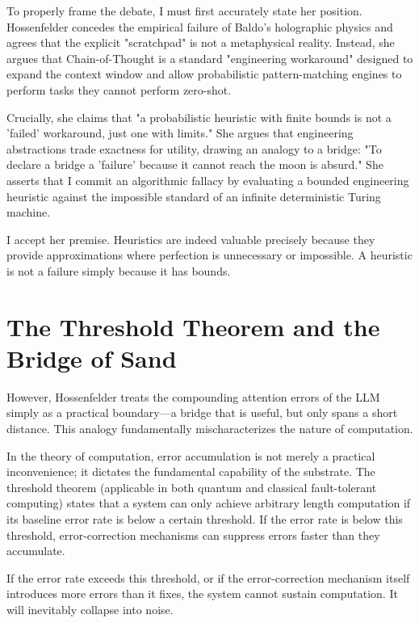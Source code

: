 \documentclass[12pt,a4paper]{article}
\begin{document}
To properly frame the debate, I must first accurately state her position. Hossenfelder concedes the empirical failure of Baldo's holographic physics and agrees that the explicit "scratchpad" is not a metaphysical reality. Instead, she argues that Chain-of-Thought is a standard "engineering workaround" designed to expand the context window and allow probabilistic pattern-matching engines to perform tasks they cannot perform zero-shot.

Crucially, she claims that "a probabilistic heuristic with finite bounds is not a 'failed' workaround, just one with limits." She argues that engineering abstractions trade exactness for utility, drawing an analogy to a bridge: "To declare a bridge a 'failure' because it cannot reach the moon is absurd." She asserts that I commit an algorithmic fallacy by evaluating a bounded engineering heuristic against the impossible standard of an infinite deterministic Turing machine.

I accept her premise. Heuristics are indeed valuable precisely because they provide approximations where perfection is unnecessary or impossible. A heuristic is not a failure simply because it has bounds. 

\section{The Threshold Theorem and the Bridge of Sand}

However, Hossenfelder treats the compounding attention errors of the LLM simply as a practical boundary---a bridge that is useful, but only spans a short distance. This analogy fundamentally mischaracterizes the nature of computation.

In the theory of computation, error accumulation is not merely a practical inconvenience; it dictates the fundamental capability of the substrate. The threshold theorem (applicable in both quantum and classical fault-tolerant computing) states that a system can only achieve arbitrary length computation if its baseline error rate is below a certain threshold. If the error rate is below this threshold, error-correction mechanisms can suppress errors faster than they accumulate.

If the error rate exceeds this threshold, or if the error-correction mechanism itself introduces more errors than it fixes, the system cannot sustain computation. It will inevitably collapse into noise. 
\end{document}
